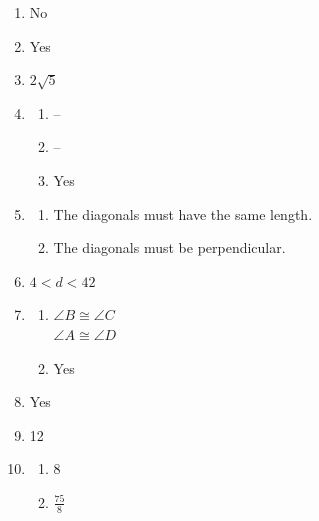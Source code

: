 \documentclass{article}
\begin{document}
\begin{enumerate}
\item No

\item Yes

\item $2 \sqrt{5}$

\item

	\begin{enumerate}
	
	\item --
	
	\item --
	
	\item Yes
	
	\end{enumerate}
	
\item 

	\begin{enumerate}
	
	\item The diagonals must have the same length.
	
	\item The diagonals must be perpendicular.
	
	\end{enumerate}
	
\item $4 < d < 42$

\item

	\begin{enumerate}
	
	\item $\angle B \cong \angle C$ \\
		$\angle A \cong \angle D$
		
	\item Yes
	
	\end{enumerate}
	
\item Yes

\item 12

\item

	\begin{enumerate}
	
	\item 8
	
	\item $\frac{75}{8}$
	

\end{enumerate}
\end{enumerate}
\end{document}

